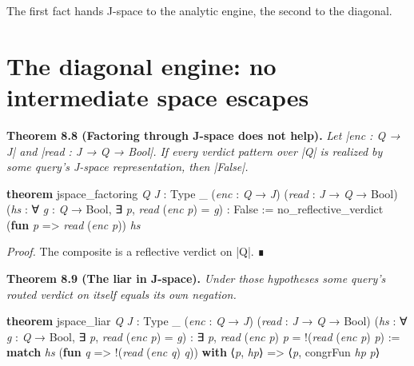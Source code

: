 \documentclass{memoir}
\begin{document}
The first fact hands J-space to the analytic engine, the second to the diagonal.



\section{The diagonal engine: no intermediate space escapes}\label{Two--Schemas--of--Impossibility-005F-005F-005F--Machine--Checked--Limits--of--Trustworthy--Machine--Learning-005F-005F-005F--and--Why--They--Tighten--with--Capability----J--Space-005F-005F-005F--and--Why--It--Does--Not--Escape----The--diagonal--engine-005F-005F-005F--no--intermediate--space--escapes}

\textbf{Theorem 8.8 (Factoring through J-space does not help).} \emph{Let \LeanVerb|enc : Q → J| and
\LeanVerb|read : J → Q → Bool|. If every verdict pattern over \LeanVerb|Q| is realized by some
query's J-space representation, then \LeanVerb|False|.}

\begin{LeanVerbatim}
\textbf{theorem} jspace_factoring \textit{Q} \textit{J} : Type _
    (\textit{enc} : \textit{Q} → \textit{J}) (\textit{read} : \textit{J} → \textit{Q} → Bool)
    (\textit{hs} : ∀ \textit{g} : \textit{Q} → Bool, ∃ \textit{p}, \textit{read} (\textit{enc} \textit{p}) = \textit{g}) :
    False :=
  no_reflective_verdict (\textbf{fun} \textit{p} => \textit{read} (\textit{enc} \textit{p})) \textit{hs}

\end{LeanVerbatim}


\emph{Proof.} The composite is a reflective verdict on \LeanVerb|Q|. ∎

\textbf{Theorem 8.9 (The liar in J-space).} \emph{Under those hypotheses some query's routed
verdict on itself equals its own negation.}

\begin{LeanVerbatim}
\textbf{theorem} jspace_liar \textit{Q} \textit{J} : Type _
    (\textit{enc} : \textit{Q} → \textit{J}) (\textit{read} : \textit{J} → \textit{Q} → Bool)
    (\textit{hs} : ∀ \textit{g} : \textit{Q} → Bool, ∃ \textit{p}, \textit{read} (\textit{enc} \textit{p}) = \textit{g}) :
    ∃ \textit{p}, \textit{read} (\textit{enc} \textit{p}) \textit{p} = !(\textit{read} (\textit{enc} \textit{p}) \textit{p}) :=
  \textbf{match} \textit{hs} (\textbf{fun} \textit{q} => !(\textit{read} (\textit{enc} \textit{q}) \textit{q})) \textbf{with}
   ⟨\textit{p}, \textit{hp}⟩ => ⟨\textit{p}, congrFun \textit{hp} \textit{p}⟩

\end{LeanVerbatim}
\end{document}
